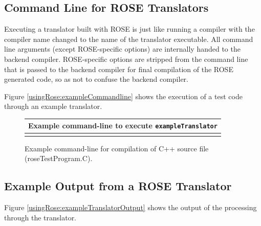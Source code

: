 \subsection{Command Line for ROSE Translators}
\label{usingRose:commandline}

  Executing a translator built with ROSE is just like running a compiler
with the compiler name changed to the name of the translator executable.
All command line arguments (except ROSE-specific options) are internally handed
to the backend compiler. ROSE-specific options are stripped from the command line
that is passed to the backend compiler for final compilation of the ROSE generated
code, so as not to confuse the backend compiler.

Figure \ref{usingRose:exampleCommandline} shows the execution of a test code through an example translator.

{\indent
{\mySmallFontSize

\begin{latexonly}
\begin{figure}[tb]
\begin{center}
\begin{tabular}{|c|} \hline
     Example command-line to execute {\tt exampleTranslator}
\\\hline\hline

\\\hline
\end{tabular}
\end{center}
\caption{ Example command-line for compilation of C++ source file (roseTestProgram.C). }
\end{figure}
\end{latexonly}

\begin{htmlonly}
   
\end{htmlonly}

\label{usingRose:exampleCommandline}

}
}

\subsection{Example Output from a ROSE Translator}
\label{usingRose:executableOutput}

   Figure \ref{usingRose:exampleTranslatorOutput} shows the output 
of the processing through the translator.

